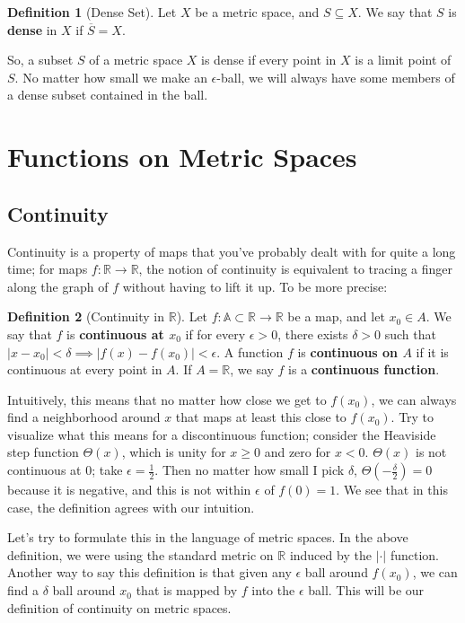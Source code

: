 \documentclass[11pt, oneside]{amsart}   	%
\theoremstyle{definition}
\newtheorem{definition}{Definition}[section]
\begin{document}
	\begin{definition}[Dense Set]
		Let $X$ be a metric space, and $S\subseteq X$. We say that $S$ is \textbf{dense} in $X$ if $\overline{S} = X$. 
	\end{definition}
	
	So, a subset $S$ of a metric space $X$ is dense if every point in $X$ is a limit point of $S$. No matter how small we make an $\epsilon$-ball, we will always 
	have some members of a dense subset contained in the ball.
	
\section{Functions on Metric Spaces}

	\subsection{Continuity}

	Continuity is a property of maps that you've probably dealt with for quite a long time; for maps $f : \mathbb R\rightarrow\mathbb R$, the notion of continuity 
	is equivalent to tracing a finger along the graph of $f$ without having to lift it up. To be more precise:
	
	\begin{definition}[Continuity in $\mathbb R$]
		Let $f : \mathbb A\subset\mathbb R\rightarrow \mathbb R$ be a map, and let $x_0\in A$. We say that $f$ is \textbf{continuous at $x_0$} if for every 
		$\epsilon > 0$, there exists $\delta > 0$ such that $|x - x_0| < \delta\implies |f(x) - f(x_0)| < \epsilon$. A function $f$ is \textbf{continuous on $A$} if 
		it is continuous at every point in $A$. If $A = \mathbb R$, we say $f$ is a \textbf{continuous function}.
	\end{definition}
	
	Intuitively, this means that no matter how close we get to $f(x_0)$, we can always find a neighborhood around $x$ that maps at least this close to $f(x_0)$. 
	Try to visualize what this means for a discontinuous function; consider the Heaviside step function $\Theta(x)$, which is unity for $x \geq 0$ and zero for $x
	< 0$. $\Theta(x)$ is not continuous at $0$; take $\epsilon = \frac{1}{2}$. Then no matter how small I pick $\delta$, $\Theta(-\frac{\delta}{2}) = 0$ because it 
	is negative, and this is not within $\epsilon$ of $f(0) = 1$. We see that in this case, the definition agrees with our intuition.
	
	Let's try to formulate this in the language of metric spaces. In the above definition, we were using the standard metric on $\mathbb R$ induced by the 
	$|\cdot|$ function. Another way to say this definition is that given any $\epsilon$ ball around $f(x_0)$, we can find a $\delta$ ball around $x_0$ that is 
	mapped by $f$ into the $\epsilon$ ball. This will be our definition of continuity on metric spaces.
	
\end{document}
